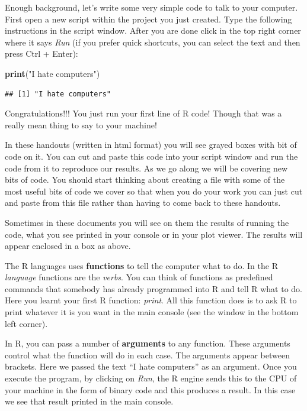 \documentclass[]{book}
\newenvironment{Shaded}{\begin{snugshade}}{\end{snugshade}}
\newcommand{\KeywordTok}[1]{\textcolor[rgb]{0.13,0.29,0.53}{\textbf{#1}}}
\newcommand{\NormalTok}[1]{#1}
\newcommand{\StringTok}[1]{\textcolor[rgb]{0.31,0.60,0.02}{#1}}
\begin{document}
Enough background, let's write some very simple code to talk to your computer. First open a new script within the project you just created. Type the following instructions in the script window. After you are done click in the top right corner where it says \emph{Run} (if you prefer quick shortcuts, you can select the text and then press Ctrl + Enter):

\begin{Shaded}
\begin{Highlighting}[]
\KeywordTok{print}\NormalTok{(}\StringTok{"I hate computers"}\NormalTok{)}
\end{Highlighting}
\end{Shaded}

\begin{verbatim}
## [1] "I hate computers"
\end{verbatim}

Congratulations!!! You just run your first line of R code! Though that was a really mean thing to say to your machine!

In these handouts (written in html format) you will see grayed boxes with bit of code on it. You can cut and paste this code into your script window and run the code from it to reproduce our results. As we go along we will be covering new bits of code. You should start thinking about creating a file with some of the most useful bits of code we cover so that when you do your work you can just cut and paste from this file rather than having to come back to these handouts.

Sometimes in these documents you will see on them the results of running the code, what you see printed in your console or in your plot viewer. The results will appear enclosed in a box as above.

The R languages uses \textbf{functions} to tell the computer what to do. In the R \emph{language} functions are the \emph{verbs}. You can think of functions as predefined commands that somebody has already programmed into R and tell R what to do. Here you learnt your first R function: \emph{print}. All this function does is to ask R to print whatever it is you want in the main console (see the window in the bottom left corner).

In R, you can pass a number of \textbf{arguments} to any function. These arguments control what the function will do in each case. The arguments appear between brackets. Here we passed the text ``I hate computers'' as an argument. Once you execute the program, by clicking on \emph{Run}, the R engine sends this to the CPU of your machine in the form of binary code and this produces a result. In this case we see that result printed in the main console.
\end{document}
